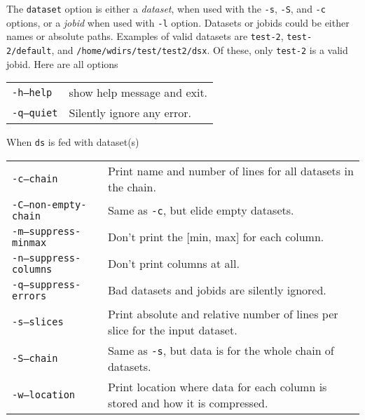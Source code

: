 The \texttt{dataset} option is either a \textsl{dataset}, when used
with the \texttt{-s}, \texttt{-S}, and \texttt{-c} options, or a
\textsl{jobid} when used with \texttt{-l} option.  Datasets or jobids
could be either names or absolute paths.  Examples of valid datasets
are \texttt{test-2}, \texttt{test-2/default}, and
\texttt{/home/wdirs/test/test2/dsx}.  Of these, only \texttt{test-2}
is a valid jobid.
Here are all options
\begin{snugshade}
\begin{tabular}{p{4cm}p{9cm}}
  \texttt{-h}\hspace{3cm}\texttt{---help} & show help message and exit.\\[4ex]
  \texttt{-q}\hspace{3cm}\texttt{---quiet} & Silently ignore any error.\\
\end{tabular}
\end{snugshade}
When \texttt{ds} is fed with dataset(s)
\begin{snugshade}
\begin{tabular}{p{4cm}p{9cm}}
  \texttt{-c}\hspace{3cm}\texttt{---chain} & Print name and number of
  lines for all datasets in the chain.\\[4ex]
  \texttt{-C}\hspace{3cm}\texttt{---non-empty-chain} & Same as \texttt{-c},
  but elide empty datasets.\\[4ex]
  \texttt{-m}\hspace{3cm}\texttt{---suppress-minmax} & Don't print the
  [min, max] for each column.\\[4ex]
  \texttt{-n}\hspace{3cm}\texttt{---suppress-columns} & Don't print columns
  at all.\\[4ex]
  \texttt{-q}\hspace{3cm}\texttt{---suppress-errors} & Bad datasets and
  jobids are silently ignored.\\[4ex]
  \texttt{-s}\hspace{3cm}\texttt{---slices} & Print absolute and
  relative number of lines per slice for the input dataset.\\[2ex]
  \texttt{-S}\hspace{3cm}\texttt{---chain} & Same as \texttt{-s}, but
  data is for the whole chain of datasets.\\[4ex]
  \texttt{-w}\hspace{3cm}\texttt{---location} & Print location where data
  for each column is stored and how it is compressed.\\
\end{tabular}
\end{snugshade}
